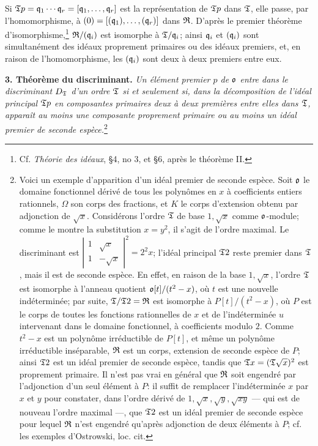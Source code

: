 Si
$\mathfrak T p=\mathfrak q_1\cdots\mathfrak q_r=[\mathfrak q_1,\ldots,\mathfrak q_r]$
est la représentation de $\mathfrak T p$ dans $\mathfrak T$, elle passe, par l'homomorphisme, à
$(0)=[(\mathfrak q_1),\ldots,(\mathfrak q_r)]$
dans $\mathfrak R$. D'après le premier théorème d'isomorphisme,\footnote{Cf. \emph{Théorie des idéaux}, \S 4, no 3, et \S 6, après le théorème II.} $\mathfrak R/(\mathfrak q_i)$ est isomorphe à $\mathfrak T/\mathfrak q_i$; ainsi $\mathfrak q_i$ et $(\mathfrak q_i)$ sont simultanément des idéaux proprement primaires ou des idéaux premiers, et, en raison de l'homomorphisme, les $(\mathfrak q_i)$ sont deux à deux premiers entre eux.

\textbf{3. Théorème du discriminant.} \emph{Un élément premier $p$ de $\mathfrak o$ entre dans le discriminant $D_\mathfrak T$ d'un ordre $\mathfrak T$ si et seulement si, dans la décomposition de l'idéal principal $\mathfrak T p$ en composantes primaires deux à deux premières entre elles dans $\mathfrak T$, apparaît au moins une composante proprement primaire ou au moins un idéal premier de seconde espèce.}\footnote{Voici un exemple d'apparition d'un idéal premier de seconde espèce. Soit $\mathfrak o$ le domaine fonctionnel dérivé de tous les polynômes en $x$ à coefficients entiers rationnels, $\Omega$ son corps des fractions, et $K$ le corps d'extension obtenu par adjonction de $\sqrt{x}$. Considérons l'ordre $\mathfrak T$ de base $1,\sqrt{x}$ comme $\mathfrak o$-module; comme le montre la substitution $x=y^2$, il s'agit de l'ordre maximal. Le discriminant est $\left|\begin{smallmatrix}1&\sqrt{x}\\1&-\sqrt{x}\end{smallmatrix}\right|^2=2^2x$; l'idéal principal $\mathfrak T2$ reste premier dans $\mathfrak T$, mais il est de seconde espèce. En effet, en raison de la base $1,\sqrt{x}$, l'ordre $\mathfrak T$ est isomorphe à l'anneau quotient $\mathfrak o[t]/(t^2-x)$, où $t$ est une nouvelle indéterminée; par suite, $\mathfrak T/\mathfrak T2=\mathfrak R$ est isomorphe à $P[t]/(t^2-x)$, où $P$ est le corps de toutes les fonctions rationnelles de $x$ et de l'indéterminée $u$ intervenant dans le domaine fonctionnel, à coefficients modulo $2$. Comme $t^2-x$ est un polynôme irréductible de $P[t]$, et même un polynôme irréductible inséparable, $\mathfrak R$ est un corps, extension de seconde espèce de $P$; ainsi $\mathfrak T2$ est un idéal premier de seconde espèce, tandis que $\mathfrak T x=(\mathfrak T\sqrt{x})^2$ est proprement primaire. Il n'est pas vrai en général que $\mathfrak R$ soit engendré par l'adjonction d'un seul élément à $P$: il suffit de remplacer l'indéterminée $x$ par $x$ et $y$ pour constater, dans l'ordre dérivé de $1,\sqrt{x},\sqrt{y},\sqrt{xy}$ --- qui est de nouveau l'ordre maximal ---, que $\mathfrak T2$ est un idéal premier de seconde espèce pour lequel $\mathfrak R$ n'est engendré qu'après adjonction de deux éléments à $P$; cf. les exemples d'Ostrowski, loc. cit.}

